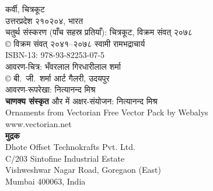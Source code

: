 \documentclass[luatex,twoside]{book}
\begin{document}
\begin{titlepage}
\begin{center}
\vspace*{0.5mm}
{\fontsize{15}{17.5}\selectfont कर्वी, चित्रकूट}\\
\vspace*{0.5mm}
{\fontsize{15}{17.5}\selectfont उत्तरप्रदेश २१०२०४, भारत}\\
\vfill
{\devanagarifont\fontsize{15}{17.5}\selectfont चतुर्थ  संस्करण (पाँच सहस्र प्रतियाँ): चित्रकूट, विक्रम संवत् २०७८}\\
\vfill
{\englishfont \fontsize{12}{13}\selectfont © }{\devanagarifont\fontsize{15}{17.5}\selectfont विक्रम संवत् २०४१–२०७८ स्वामी रामभद्राचार्य}\\
\vfill
{\englishfont \fontsize{11}{13}\selectfont \foreignlanguage{english}{ISBN-13: 978-93-82253-07-5}}\\
\vfill
{\devanagarifont\fontsize{15}{17.5}\selectfont आवरण-चित्र: भँवरलाल गिरधारीलाल शर्मा\\
\vspace*{1mm}
{\englishfont \fontsize{12}{13}\selectfont ©} बी.~जी.~शर्मा आर्ट गैलरी, उदयपुर}\\
\vfill
{\devanagarifont\fontsize{15}{17.5}\selectfont आवरण-रूपरेखा: नित्यानन्द मिश्र}\\
\vfill
{\devanagarifont\fontsize{15}{17.5}\selectfont \textbf{चाणक्य संस्कृत} और {}में अक्षर-संयोजन: नित्यानन्द मिश्र}\\
\vfill
{\englishfont \fontsize{11}{13}\selectfont Ornaments from Vectorian Free Vector Pack by Webalys\\www.vectorian.net}\\
\vfill
{\devanagarifont\fontsize{15}{17.5}\selectfont \textbf{मुद्रक}}\\{\englishfont \fontsize{11}{13}\selectfont \foreignlanguage{english}{Dhote Offset Technokrafts Pvt. Ltd.\\C/203 Sintofine Industrial Estate\\Vishweshwar Nagar Road, Goregaon (East)\\Mumbai 400063, India}}\\
\end{center}
\end{titlepage}

% 
\begin{figure}[p]
\vspace*{-2.25cm}
\hspace*{-1.65cm}
\end{figure}
\end{document}
